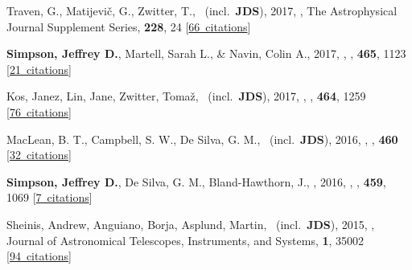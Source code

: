 \item[{\color{numcolor}\scriptsize9}] Traven, G., Matijevi{\v{c}}, G., Zwitter, T., \etal\ (incl.\ \textbf{JDS}), 2017, , The Astrophysical Journal Supplement Series, \textbf{228}, 24 [\href{https://ui.adsabs.harvard.edu/#abs/2017ApJS..228...24T}{66~citations}]

\item[{\color{numcolor}\scriptsize8}] \textbf{Simpson, Jeffrey D.}, Martell, Sarah L., \& Navin, Colin A., 2017, , \mnras, \textbf{465}, 1123 [\href{https://ui.adsabs.harvard.edu/#abs/2017MNRAS.465.1123S}{21~citations}]

\item[{\color{numcolor}\scriptsize7}] Kos, Janez, Lin, Jane, Zwitter, Toma{\v{z}}, \etal\ (incl.\ \textbf{JDS}), 2017, , \mnras, \textbf{464}, 1259 [\href{https://ui.adsabs.harvard.edu/#abs/2017MNRAS.464.1259K}{76~citations}]

\item[{\color{numcolor}\scriptsize6}] MacLean, B. T., Campbell, S. W., De Silva, G. M., \etal\ (incl.\ \textbf{JDS}), 2016, , \mnras, \textbf{460} [\href{https://ui.adsabs.harvard.edu/#abs/2016MNRAS.460L..69M}{32~citations}]

\item[{\color{numcolor}\scriptsize5}] \textbf{Simpson, Jeffrey D.}, De Silva, G. M., Bland-Hawthorn, J., \etal, 2016, , \mnras, \textbf{459}, 1069 [\href{https://ui.adsabs.harvard.edu/#abs/2016MNRAS.459.1069S}{7~citations}]

\item[{\color{numcolor}\scriptsize4}] Sheinis, Andrew, Anguiano, Borja, Asplund, Martin, \etal\ (incl.\ \textbf{JDS}), 2015, , Journal of Astronomical Telescopes, Instruments, and Systems, \textbf{1}, 35002 [\href{https://ui.adsabs.harvard.edu/#abs/2015JATIS...1c5002S}{94~citations}]

